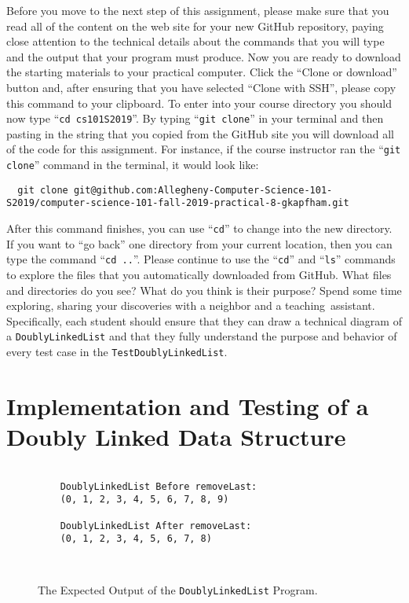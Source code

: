 \documentclass[11pt]{article}
\newcommand{\mainprogram}{\lstinline{DoublyLinkedList}}
\newcommand{\command}[1]{``\lstinline{#1}''}
\newcommand{\program}[1]{\lstinline{#1}}
\newcommand{\step}[1]{``{#1}''}
\begin{document}

Before you move to the next step of this assignment, please make sure that you
read all of the content on the web site for your new GitHub repository, paying
close attention to the technical details about the commands that you will type
and the output that your program must produce. Now you are ready to download the
starting materials to your practical computer. Click the ``Clone or download''
button and, after ensuring that you have selected ``Clone with SSH'', please
copy this command to your clipboard. To enter into your course directory you
should now type \command{cd cs101S2019}. By typing \command{git clone} in your
terminal and then pasting in the string that you copied from the GitHub site you
will download all of the code for this assignment. For instance, if the course
instructor ran the \command{git clone} command in the terminal, it would look
like:

\begin{lstlisting}
  git clone git@github.com:Allegheny-Computer-Science-101-S2019/computer-science-101-fall-2019-practical-8-gkapfham.git
\end{lstlisting}

After this command finishes, you can use \command{cd} to change into the new
directory. If you want to \step{go back} one directory from your current
location, then you can type the command \command{cd ..}. Please continue to use
the \command{cd} and \command{ls} commands to explore the files that you
automatically downloaded from GitHub. What files and directories do you see?
What do you think is their purpose? Spend some time exploring, sharing your
discoveries with a neighbor and a \mbox{teaching assistant}. Specifically, each
student should ensure that they can draw a technical diagram of a \mainprogram{}
and that they fully understand the purpose and behavior of every test case in
the \program{TestDoublyLinkedList}.

\section*{Implementation and Testing of a Doubly Linked Data Structure}

\begin{figure}[t]
  \centering
  \begin{verbatim}

    DoublyLinkedList Before removeLast:
    (0, 1, 2, 3, 4, 5, 6, 7, 8, 9)

    DoublyLinkedList After removeLast:
    (0, 1, 2, 3, 4, 5, 6, 7, 8)
  \end{verbatim}

  \vspace*{-.35in}
  \caption{The Expected Output of the \mainprogram{} Program.}~\label{fig:output}
  \vspace*{-.1in}
\end{figure}
\end{document}
